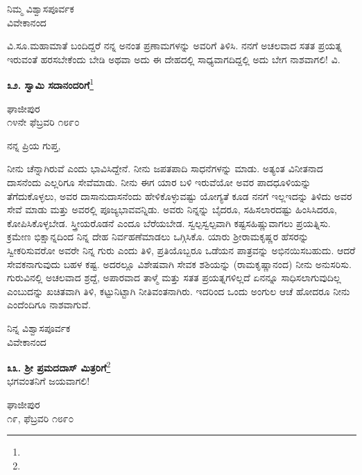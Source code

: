\begin{flushright}
ನಿಮ್ಮ ವಿಶ್ವಾಸಪೂರ್ವಕ\\ವಿವೇಕಾನಂದ
\end{flushright}

ವಿ.ಸೂ.\enginline{-}ಮಹಾಮಾತೆ ಬಂದಿದ್ದರೆ ನನ್ನ ಅನಂತ ಪ್ರಣಾಮಗಳನ್ನು ಅವರಿಗೆ ತಿಳಿಸಿ. ನನಗೆ ಅಚಲವಾದ ಸತತ ಪ್ರಯತ್ನ ಇರುವಂತೆ ಹರಸಬೇಕೆಂದು ಬೇಡಿ ಅಥವಾ ಅದು ಈ ದೇಹದಲ್ಲಿ ಸಾಧ್ಯವಾಗದಿದ್ದಲ್ಲಿ ಅದು ಬೇಗ ನಾಶವಾಗಲಿ! \enginline{-} ವಿ.

\begin{center}
\textbf{೩೨. ಸ್ವಾಮಿ ಸದಾನಂದರಿಗೆ}\footnote{}
\end{center}

\vspace{-0.5cm}

\begin{flushright}
ಘಾಜೀಪುರ\\೧೪ನೇ ಫೆಬ್ರವರಿ ೧೮೯೦
\end{flushright}

\noindent
ನನ್ನ ಪ್ರಿಯ ಗುಪ್ತ,

ನೀನು ಚೆನ್ನಾಗಿರುವೆ ಎಂದು ಭಾವಿಸಿದ್ದೇನೆ. ನೀನು ಜಪತಪಾದಿ ಸಾಧನೆಗಳನ್ನು ಮಾಡು. ಅತ್ಯಂತ ವಿನೀತನಾದ ದಾಸನೆಂದು ಎಲ್ಲರಿಗೂ ಸೇವೆಮಾಡು. ನೀನು ಈಗ ಯಾರ ಬಳಿ ಇರುವೆಯೋ ಅವರ ಪಾದಧೂಳಿಯನ್ನು ತೆಗೆದುಕೊಳ್ಳಲು, ಅವರ ದಾಸಾನುದಾಸನೆಂದು ಹೇಳಿಕೊಳ್ಳುವಷ್ಟು ಯೋಗ್ಯತೆ ಕೂಡ ನನಗೆ ಇಲ್ಲ\enginline{-}ಇದನ್ನು ತಿಳಿದು ಅವರ ಸೇವೆ ಮಾಡು ಮತ್ತು ಅವರಲ್ಲಿ ಪೂಜ್ಯಭಾವವನ್ನಿಡು. ಅವರು ನಿನ್ನನ್ನು ಬೈದರೂ, ಸಹಿಸಲಾರದಷ್ಟು ಹಿಂಸಿಸಿದರೂ, ಕೋಪಿಸಿಕೊಳ್ಳಬೇಡ. ಸ್ತ್ರೀಯರೊಡನೆ ಎಂದೂ ಬೆರೆಯಬೇಡ. ಸ್ವಲ್ಪಸ್ವಲ್ಪವಾಗಿ ಕಷ್ಟಸಹಿಷ್ಣುವಾಗಲು ಪ್ರಯತ್ನಿಸು. ಕ್ರಮೇಣ ಭಿಕ್ಷಾನ್ನದಿಂದ ನಿನ್ನ ದೇಹ ನಿರ್ವಹಣೆಮಾಡಲು ಒಗ್ಗಿಸಿಕೊ. ಯಾರು ಶ‍್ರೀರಾಮಕೃಷ್ಣರ ಹೆಸರನ್ನು ಸ್ವೀಕರಿಸುವರೋ ಅವರೇ ನಿನ್ನ ಗುರು ಎಂದು ತಿಳಿ, ಪ್ರತಿಯೊಬ್ಬರೂ ಒಡೆಯನ ಪಾತ್ರವನ್ನು ಅಭಿನಯಿಸಬಹುದು. ಆದರೆ ಸೇವಕನಾಗುವುದು ಬಹಳ ಕಷ್ಟ. ಅದರಲ್ಲೂ ವಿಶೇಷವಾಗಿ ಸೇವಕ ಶಶಿಯನ್ನು (ರಾಮಕೃಷ್ಣಾನಂದ) ನೀನು ಅನುಸರಿಸು. ಗುರುವಿನಲ್ಲಿ ಅಚಲವಾದ ಶ್ರದ್ದೆ, ಅಪಾರವಾದ ತಾಳ್ಮೆ ಮತ್ತು ಸತತ ಪ್ರಯತ್ನಗಳಿಲ್ಲದೆ ಏನನ್ನೂ ಸಾಧಿಸಲಾಗುವುದಿಲ್ಲ ಎಂಬುದನ್ನು ಖಚಿತವಾಗಿ ತಿಳಿ, ಕಟ್ಟುನಿಟ್ಟಾಗಿ ನೀತಿವಂತನಾಗಿರು. ಇದರಿಂದ ಒಂದು ಅಂಗುಲ ಆಚೆ ಹೋದರೂ ನೀನು ಎಂದೆಂದಿಗೂ ನಾಶವಾಗುವೆ.

\vspace{-0.5cm}

{\flushright
ನಿನ್ನ ವಿಶ್ವಾಸಪೂರ್ವಕ\\ವಿವೇಕಾನಂದ\par}

\begin{center}
\textbf{೩೩. ಶ‍್ರೀ ಪ್ರಮದದಾಸ್‌ ಮಿತ್ರರಿಗೆ}\footnote{}\\ ಭಗವಂತನಿಗೆ ಜಯವಾಗಲಿ!
\end{center}

\begin{flushright}
ಘಾಜೀಪುರ\\೧೯, ಫೆಬ್ರವರಿ ೧೮೯೦
\end{flushright}


